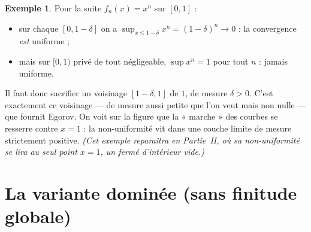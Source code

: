 \documentclass[11pt,a4paper]{article}
\theoremstyle{plain}
\theoremstyle{definition}
\newtheorem{exemple}{Exemple}
\newcommand{\1}{\mathbf{1}}
\begin{document}
\begin{center}
\end{center}

\begin{exemple}\label{ex:xn}
Pour la suite $f_n(x)=x^n$ sur $[0,1]$ :
\begin{itemize}[nosep]
\item sur chaque $[0,1-\delta]$ on a $\sup_{x\le 1-\delta}x^n=(1-\delta)^n\to0$ :
      la convergence \emph{est} uniforme ;
\item mais sur $[0,1)$ privé de tout négligeable, $\sup x^n=1$ pour tout $n$ :
      jamais uniforme.
\end{itemize}
Il faut donc sacrifier un voisinage $[1-\delta,1]$ de $1$, de mesure $\delta>0$.
C'est exactement ce voisinage — de mesure aussi petite que l'on veut mais non
nulle — que fournit Egorov. On voit sur la figure que la « marche » des courbes
se resserre contre $x=1$ : la non-uniformité vit dans une couche limite de mesure
strictement positive. \emph{(Cet exemple reparaîtra en Partie~II, où sa
non-uniformité se lira au seul point $x=1$, un fermé d'intérieur vide.)}
\end{exemple}

\section{La variante dominée (sans finitude globale)}
\end{document}
